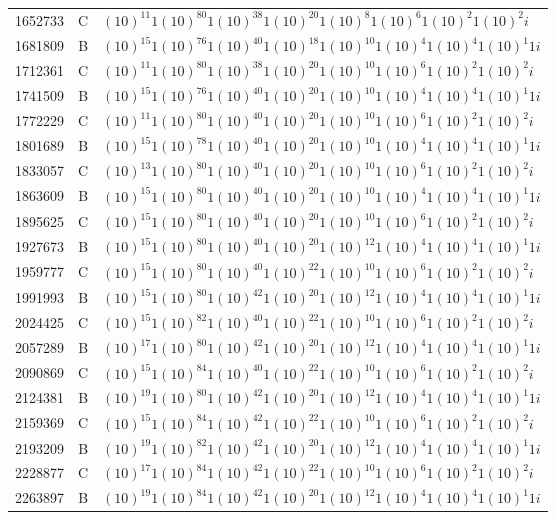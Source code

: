 \documentclass[12pt]{article}
\begin{document}
\begin{table}[H]
\begin{Parallel}[c]{0.48\textwidth}{0.48\textwidth}
{{\begin{tiny}
\begin{tabular}{rrl}
1652733&C&$(10)^{11}1(10)^{80}1(10)^{38}1(10)^{20}1(10)^{8}1(10)^{6}1(10)^{2}1(10)^{2}i$\\
1681809&B&$(10)^{15}1(10)^{76}1(10)^{40}1(10)^{18}1(10)^{10}1(10)^{4}1(10)^{4}1(10)^{1}1i$\\
1712361&C&$(10)^{11}1(10)^{80}1(10)^{38}1(10)^{20}1(10)^{10}1(10)^{6}1(10)^{2}1(10)^{2}i$\\
1741509&B&$(10)^{15}1(10)^{76}1(10)^{40}1(10)^{20}1(10)^{10}1(10)^{4}1(10)^{4}1(10)^{1}1i$\\
1772229&C&$(10)^{11}1(10)^{80}1(10)^{40}1(10)^{20}1(10)^{10}1(10)^{6}1(10)^{2}1(10)^{2}i$\\
1801689&B&$(10)^{15}1(10)^{78}1(10)^{40}1(10)^{20}1(10)^{10}1(10)^{4}1(10)^{4}1(10)^{1}1i$\\
1833057&C&$(10)^{13}1(10)^{80}1(10)^{40}1(10)^{20}1(10)^{10}1(10)^{6}1(10)^{2}1(10)^{2}i$\\
1863609&B&$(10)^{15}1(10)^{80}1(10)^{40}1(10)^{20}1(10)^{10}1(10)^{4}1(10)^{4}1(10)^{1}1i$\\
1895625&C&$(10)^{15}1(10)^{80}1(10)^{40}1(10)^{20}1(10)^{10}1(10)^{6}1(10)^{2}1(10)^{2}i$\\
1927673&B&$(10)^{15}1(10)^{80}1(10)^{40}1(10)^{20}1(10)^{12}1(10)^{4}1(10)^{4}1(10)^{1}1i$\\
1959777&C&$(10)^{15}1(10)^{80}1(10)^{40}1(10)^{22}1(10)^{10}1(10)^{6}1(10)^{2}1(10)^{2}i$\\
1991993&B&$(10)^{15}1(10)^{80}1(10)^{42}1(10)^{20}1(10)^{12}1(10)^{4}1(10)^{4}1(10)^{1}1i$\\
2024425&C&$(10)^{15}1(10)^{82}1(10)^{40}1(10)^{22}1(10)^{10}1(10)^{6}1(10)^{2}1(10)^{2}i$\\
2057289&B&$(10)^{17}1(10)^{80}1(10)^{42}1(10)^{20}1(10)^{12}1(10)^{4}1(10)^{4}1(10)^{1}1i$\\
2090869&C&$(10)^{15}1(10)^{84}1(10)^{40}1(10)^{22}1(10)^{10}1(10)^{6}1(10)^{2}1(10)^{2}i$\\
2124381&B&$(10)^{19}1(10)^{80}1(10)^{42}1(10)^{20}1(10)^{12}1(10)^{4}1(10)^{4}1(10)^{1}1i$\\
2159369&C&$(10)^{15}1(10)^{84}1(10)^{42}1(10)^{22}1(10)^{10}1(10)^{6}1(10)^{2}1(10)^{2}i$\\
2193209&B&$(10)^{19}1(10)^{82}1(10)^{42}1(10)^{20}1(10)^{12}1(10)^{4}1(10)^{4}1(10)^{1}1i$\\
2228877&C&$(10)^{17}1(10)^{84}1(10)^{42}1(10)^{22}1(10)^{10}1(10)^{6}1(10)^{2}1(10)^{2}i$\\
2263897&B&$(10)^{19}1(10)^{84}1(10)^{42}1(10)^{20}1(10)^{12}1(10)^{4}1(10)^{4}1(10)^{1}1i$\\

\end{tabular}
\end{tiny}}}
\end{Parallel}
\end{table}
\end{document}
